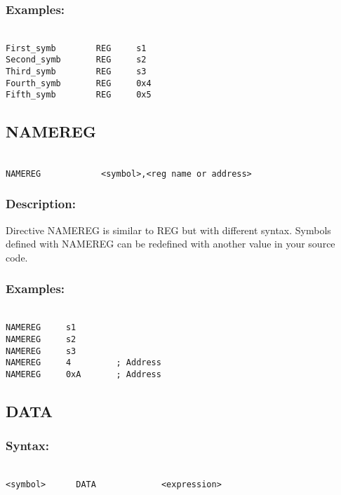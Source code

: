         \subsubsection{Examples:}
            {
            ~\\
            \usecodefont
            \verb'First_symb        REG     s1'\\
            \verb'Second_symb       REG     s2'\\
            \verb'Third_symb        REG     s3'\\
            \verb'Fourth_symb       REG     0x4'\\
            \verb'Fifth_symb        REG     0x5'\\
            }

        \subsection{NAMEREG}
        {
            ~\\
            \usecodefont
            \verb'NAMEREG            <symbol>,<reg name or address> '
            }
        \subsubsection{Description:}
        Directive NAMEREG is similar to REG but with different syntax. Symbols defined with NAMEREG can be redefined with another value in your source
        code.

        \subsubsection{Examples:}
        {
            ~\\
            \usecodefont
            \verb'NAMEREG     s1'\\
            \verb'NAMEREG     s2'\\
            \verb'NAMEREG     s3'\\
            \verb'NAMEREG     4         ; Address'\\
            \verb'NAMEREG     0xA       ; Address'\\
        }


    \subsection{DATA}
        \subsubsection{Syntax:}
            {
                ~\\
                \usecodefont
            \verb'<symbol>      DATA             <expression>'
            }

